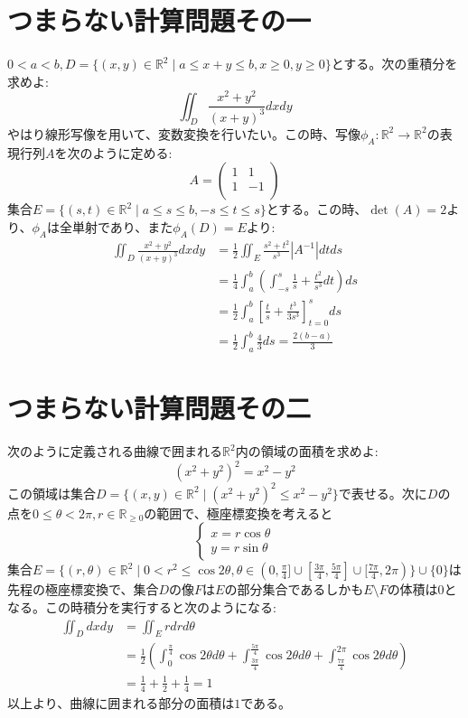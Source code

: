 \documentclass[dvipdfmx]{jreport}
\begin{document}
\section{つまらない計算問題その一}
$0<a<b,D= \{ (x,y) \in \mathbb{R}^2 \mid a\le x+y \le b, x\ge 0, y\ge 0 \}$とする。次の重積分を求めよ:
$$
\iint_D \frac{x^2 +y^2}{(x+y)^3}dxdy
$$
やはり線形写像を用いて、変数変換を行いたい。この時、写像$\phi_A : \mathbb{R}^2 \to \mathbb{R}^2$の表現行列$A$を次のように定める:
$$
A=
\left(
\begin{array}{cc}
	1 & 1\\
	1 & -1\\
\end{array}
\right)
$$
集合$E=\{ (s,t) \in \mathbb{R}^2 \mid a \le s \le b, -s \le t \le s\}$とする。この時、$\det(A) = 2$より、$\phi_A $は全単射であり、また$\phi_A(D) =E$より:
$$
\begin{aligned}
	\iint_D \frac{x^2 +y^2}{(x+y)^3}dxdy &= \frac{1}{2} \iint_E \frac{s^2 +t^2}{s^3}|A^{-1}|dtds\\
					     &=\frac{1}{4} \int_a^b \left( \int_{-s}^{s} \frac{1}{s} +\frac{t^2}{s^3} dt \right) ds\\
					     &=\frac{1}{2} \int_a^b \left[ \frac{t}{s} + \frac{t^3}{3s^3} \right]_{t=0}^sds \\
					     &=\frac{1}{2} \int_a^b \frac{4}{3} ds =\frac{2(b-a)}{3}
\end{aligned}
$$
\newpage
\section{つまらない計算問題その二}
次のように定義される曲線で囲まれる$\mathbb{R}^2$内の領域の面積を求めよ:
$$
(x^2 +y^2)^2 = x^2 -y^2
$$
この領域は集合$D = \{ (x,y) \in \mathbb{R}^2 \mid (x^2 +y^2)^2 \le x^2 -y^2\}$で表せる。次に$D$の点を$ 0 \le \theta < 2\pi,r\in \mathbb{R}_{\ge 0} $の範囲で、極座標変換を考えると
\begin{equation}
	\begin{cases}
		x=r\cos\theta\\
		y=r\sin \theta
	\end{cases}
\end{equation}
集合$E =\{(r,\theta ) \in \mathbb{R}^2 \mid 0< r^2 \le  \cos 2\theta , \theta \in (0,\frac{\pi}{4} ] \cup [\frac{3\pi}{4},\frac{5\pi}{4}]\cup[\frac{7\pi}{4},2\pi) \}\cup\{0\}$は先程の極座標変換で、集合$D$の像$F$は$E$の部分集合であるしかも$E\setminus F$の体積は0となる。この時積分を実行すると次のようになる:
\begin{equation}
	\begin{aligned}
		\iint_D dxdy &= \iint_E rdrd\theta\\
			     &= \frac{1}{2} \left( \int_0^{\frac{\pi }{4}} \cos2\theta d\theta  
			      +\int_{\frac{3\pi}{4}}^{\frac{5\pi }{4}} \cos2\theta d\theta  
			      +\int_{\frac{7\pi }{4}}^{ 2 \pi } \cos2\theta d\theta  \right)\\
			     &=\frac{1}{4}+\frac{1}{2}+\frac{1}{4}=1
	\end{aligned}
\end{equation}
以上より、曲線に囲まれる部分の面積は$1$である。
\newpage
\end{document}
